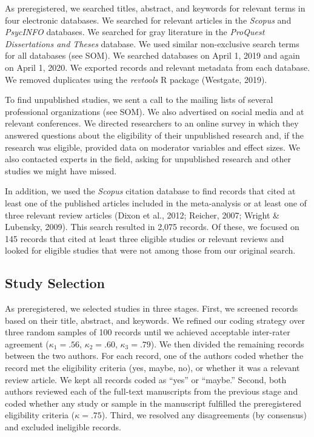 \documentclass[12pt, letterpaper]{article}
\begin{document}
As preregistered, we searched titles, abstract, and keywords for
relevant terms in four electronic databases. We searched for relevant
articles in the \emph{Scopus} and \emph{PsycINFO} databases. We searched
for gray literature in the \emph{ProQuest Dissertations and Theses}
database. We used similar non-exclusive search terms for all databases
(see SOM). We searched databases on April 1, 2019 and again on April 1,
2020. We exported records and relevant metadata from each database. We
removed duplicates using the \emph{revtools} R package (Westgate, 2019).

To find unpublished studies, we sent a call to the mailing lists of
several professional organizations (see SOM). We also advertised on
social media and at relevant conferences. We directed researchers to an
online survey in which they answered questions about the eligibility of
their unpublished research and, if the research was eligible, provided
data on moderator variables and effect sizes. We also contacted experts
in the field, asking for unpublished research and other studies we might
have missed.

In addition, we used the \emph{Scopus} citation database to find records
that cited at least one of the published articles included in the
meta-analysis or at least one of three relevant review articles (Dixon
et al., 2012; Reicher, 2007; Wright \& Lubensky, 2009). This search
resulted in 2,075 records. Of these, we focused on 145 records that
cited at least three eligible studies or relevant reviews and looked for
eligible studies that were not among those from our original search.

\hypertarget{study-selection}{%
\subsection{Study Selection}\label{study-selection}}

As preregistered, we selected studies in three stages. First, we
screened records based on their title, abstract, and keywords. We
refined our coding strategy over three random samples of 100 records
until we achieved acceptable inter-rater agreement (\(\kappa_1 = .56\),
\(\kappa_2 = .60\), \(\kappa_3 = .79\)). We then divided the remaining
records between the two authors. For each record, one of the authors
coded whether the record met the eligibility criteria (yes, maybe, no),
or whether it was a relevant review article. We kept all records coded
as ``yes'' or ``maybe.'' Second, both authors reviewed each of the
full-text manuscripts from the previous stage and coded whether any
study or sample in the manuscript fulfilled the preregistered
eligibility criteria (\(\kappa = .75\)). Third, we resolved any
disagreements (by consensus) and excluded ineligible records.
\end{document}
